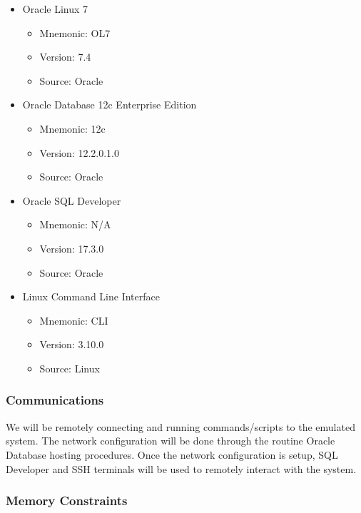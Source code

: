 \documentclass[10pt]{article}
\begin{document}
\begin{itemize}
	\item Oracle Linux 7
    \begin{itemize}
    	\item Mnemonic: OL7
        \item Version: 7.4
        \item Source: Oracle
    \end{itemize}

    \item Oracle Database 12c Enterprise Edition
    \begin{itemize}
    	\item Mnemonic: 12c
        \item Version: 12.2.0.1.0
        \item Source: Oracle
    \end{itemize}

	\item Oracle SQL Developer
    \begin{itemize}
    	\item Mnemonic: N/A
        \item Version: 17.3.0
        \item Source: Oracle
    \end{itemize}

	\item Linux Command Line Interface
    \begin{itemize}
    	\item Mnemonic: CLI
        \item Version: 3.10.0
        \item Source: Linux
    \end{itemize}
\end{itemize}

\subsubsection{Communications}

We will be remotely connecting and running commands/scripts to the emulated system. The network configuration will be done through the routine Oracle Database hosting procedures. Once the network configuration is setup, SQL Developer and SSH terminals will be used to remotely interact with the system.


\subsubsection{Memory Constraints}
\end{document}
